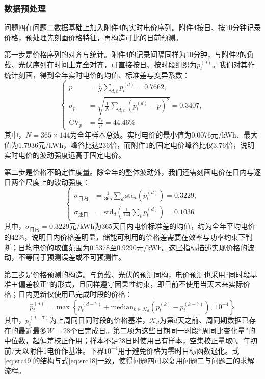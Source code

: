 \subsubsection{数据预处理}

问题四在问题二数据基础上加入附件4的实时电价序列。附件4按日、按10分钟记录价格，预处理先刻画价格特征，再构造可比的日前预测。

第一步是价格序列的对齐与统计。附件4的记录间隔同样为10分钟，与附件2的负载、光伏序列在时间上完全对齐，可直接按日、按时段组织为$p_t^{(d)}$。我们对其作统计刻画，得到全年实时电价的均值、标准差与变异系数：
\begin{equation}\label{eq:src47}
    \left\{\begin{aligned}
    \bar{p}&=\frac{1}{N}\sum_{d,t}p_{t}^{(d)}=0.7662,\\[1mm]
    \sigma_{p}&=\sqrt{\frac{1}{N}\sum_{d,t}\left(p_{t}^{(d)}-\bar{p}\right)^{2}}=0.3407,\\[1mm]
    \mathrm{CV}_{p}&=\frac{\sigma_{p}}{\bar{p}}=44.46\%
    \end{aligned}\right.
\end{equation}
其中，$N=365\times144$为全年样本总数。实时电价的最小值为0.0076元/kWh、最大值为1.7936元/kWh，峰谷比达236倍，而附件1的固定电价峰谷比仅3.76倍，说明实时电价的波动强度远高于固定电价。

第二步是价格不确定性度量。除全年的整体波动外，我们还需刻画电价在日内与逐日两个尺度上的波动强度：
\begin{equation}\label{eq:src48}
    \left\{\begin{aligned}
    \sigma_{\text{日内}}&=\frac{1}{365}\sum_{d}\mathrm{std}_{t}\left(p_{t}^{(d)}\right)=0.3229,\\[1mm]
    \sigma_{\text{逐日}}&=\mathrm{std}_{d}\left(\frac{1}{144}\sum_{t}p_{t}^{(d)}\right)=0.1036
    \end{aligned}\right.
\end{equation}
其中，$\sigma_{\text{日内}}=0.3229$元/kWh为365天日内电价标准差的均值，约为全年平均电价的42\%，说明日内价格差明显，储能可利用的价格差需要在效率与功率约束下判断；日均电价的取值范围为0.5378至0.9290元/kWh。这些指标描述实现价格的波动，不等同于预测误差或不可预测性。

第三步是价格预测的构造。与负载、光伏的预测同构，电价预测也采用“同时段基准＋偏差校正”的形式，且同样遵守因果性约束，即日前不使用当天未来实际价格；日内更新仅使用已完成时段的价格：
\begin{equation}\label{eq:src49}
    \hat{p}_{t}^{(d)}=\max\left\{p_{t}^{(d-7)}+\mathrm{median}_{k\in\mathcal K_d}\!\left(p_{t}^{(k)}-p_{t}^{(k-7)}\right),\ 10^{-4}\right\}
\end{equation}
其中，$p_t^{(d-7)}$为上周同日同时段的价格基准，$\mathcal K_d$为第$d$天之前、周同期数据已存在的最近最多$W=28$个已完成日。第二项为这些日期同一时段“周同比变化量”的中位数，起偏差校正作用；样本不足28日时使用已有样本，空集校正量取0。年初前7天以附件1电价作基准。下界$10^{-4}$用于避免价格为零时目标函数退化。式\eqref{eq:src49}的结构与式\eqref{eq:src18}一致，使得问题四可以复用问题二与问题三的求解流程。


